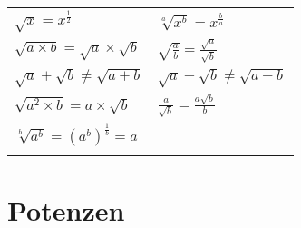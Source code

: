 \documentclass{report}
\begin{document}
\begin{tabularx}{1\textwidth} { 
     >{\centering\arraybackslash}X 
     >{\centering\arraybackslash}X  }
    \begin{math}
        \sqrt{x} =  x^\frac{1}{2}
    \end{math}
    &
    \begin{math}
        \sqrt[a]{x^b} = x^\frac{b}{a}
    \end{math}
    \\ [7pt]
    \begin{math}
        \sqrt{a \times b} = \sqrt{a} \times \sqrt{b}
    \end{math}
    &
    \begin{math}
      \sqrt{\frac{a}{b}} = \frac{\sqrt{a}}{\sqrt{b}}
    \end{math}
    \\ [7pt]
    \begin{math}
        \sqrt{a} + \sqrt{b} \ne  \sqrt{a+b}
    \end{math}
    &
    \begin{math}
        \sqrt{a} - \sqrt{b} \ne  \sqrt{a-b}
    \end{math}
    \\ [7pt]
    \begin{math}
        \sqrt{a^2 \times b} = a \times \sqrt{b}
    \end{math}
    &
    \begin{math}
        \frac{a}{\sqrt{b}} = \frac{a \sqrt{b}}{b}
    \end{math}
    \\ [7pt]
    \begin{math}
        \sqrt[b]{a^b} = ({a^b})^{\frac{1}{b}} = a
    \end{math}
    &
    \begin{math}
        {}
    \end{math}
    \\ [7pt]
    \begin{math}
        {}
    \end{math}
    &
    \begin{math}
        {}
    \end{math}
    \\ [7pt]
\end{tabularx}

\section{Potenzen}
\end{document}
